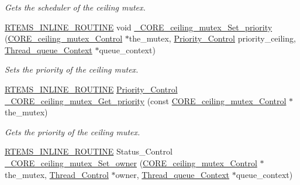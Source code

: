 \begin{DoxyCompactItemize}
\begin{DoxyCompactList}\small\item\em Gets the scheduler of the ceiling mutex. \end{DoxyCompactList}\item 
\mbox{\hyperlink{group__RTEMSScoreBaseDefs_gac216239df231d5dbd15e3520b0b9313f}{R\+T\+E\+M\+S\+\_\+\+I\+N\+L\+I\+N\+E\+\_\+\+R\+O\+U\+T\+I\+NE}} void \mbox{\hyperlink{group__RTEMSScoreMutex_gae13f723fc5cdac5a7f9b5f910b284bf6}{\+\_\+\+C\+O\+R\+E\+\_\+ceiling\+\_\+mutex\+\_\+\+Set\+\_\+priority}} (\mbox{\hyperlink{structCORE__ceiling__mutex__Control}{C\+O\+R\+E\+\_\+ceiling\+\_\+mutex\+\_\+\+Control}} $\ast$the\+\_\+mutex, \mbox{\hyperlink{group__RTEMSScorePriority_ga59d02b58072d31a9a1cfe644557aefe2}{Priority\+\_\+\+Control}} priority\+\_\+ceiling, \mbox{\hyperlink{structThread__queue__Context}{Thread\+\_\+queue\+\_\+\+Context}} $\ast$queue\+\_\+context)
\begin{DoxyCompactList}\small\item\em Sets the priority of the ceiling mutex. \end{DoxyCompactList}\item 
\mbox{\hyperlink{group__RTEMSScoreBaseDefs_gac216239df231d5dbd15e3520b0b9313f}{R\+T\+E\+M\+S\+\_\+\+I\+N\+L\+I\+N\+E\+\_\+\+R\+O\+U\+T\+I\+NE}} \mbox{\hyperlink{group__RTEMSScorePriority_ga59d02b58072d31a9a1cfe644557aefe2}{Priority\+\_\+\+Control}} \mbox{\hyperlink{group__RTEMSScoreMutex_gaba91517faca7018478e83a8ace073303}{\+\_\+\+C\+O\+R\+E\+\_\+ceiling\+\_\+mutex\+\_\+\+Get\+\_\+priority}} (const \mbox{\hyperlink{structCORE__ceiling__mutex__Control}{C\+O\+R\+E\+\_\+ceiling\+\_\+mutex\+\_\+\+Control}} $\ast$the\+\_\+mutex)
\begin{DoxyCompactList}\small\item\em Gets the priority of the ceiling mutex. \end{DoxyCompactList}\item 
\mbox{\hyperlink{group__RTEMSScoreBaseDefs_gac216239df231d5dbd15e3520b0b9313f}{R\+T\+E\+M\+S\+\_\+\+I\+N\+L\+I\+N\+E\+\_\+\+R\+O\+U\+T\+I\+NE}} Status\+\_\+\+Control \mbox{\hyperlink{group__RTEMSScoreMutex_ga3c9beab408f6eaae8af2a29d962b08f3}{\+\_\+\+C\+O\+R\+E\+\_\+ceiling\+\_\+mutex\+\_\+\+Set\+\_\+owner}} (\mbox{\hyperlink{structCORE__ceiling__mutex__Control}{C\+O\+R\+E\+\_\+ceiling\+\_\+mutex\+\_\+\+Control}} $\ast$the\+\_\+mutex, \mbox{\hyperlink{struct__Thread__Control}{Thread\+\_\+\+Control}} $\ast$owner, \mbox{\hyperlink{structThread__queue__Context}{Thread\+\_\+queue\+\_\+\+Context}} $\ast$queue\+\_\+context)

\end{DoxyCompactItemize}
